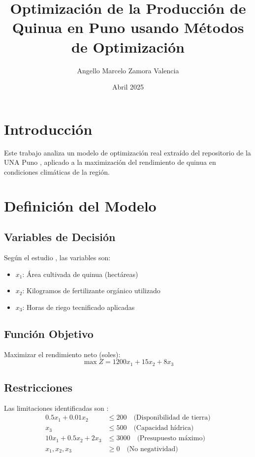 \documentclass{article}
\title{Optimización de la Producción de Quinua en Puno usando Métodos de Optimización}
\author{Angello Marcelo Zamora Valencia}
\date{Abril 2025}
\begin{document}
\maketitle

\section{Introducción}
Este trabajo analiza un modelo de optimización real extraído del repositorio de la UNA Puno \cite{condori2024}, aplicado a la maximización del rendimiento de quinua en condiciones climáticas de la región.

\section{Definición del Modelo}
\subsection{Variables de Decisión}
Según el estudio \cite{condori2024}, las variables son:
\begin{itemize}
    \item $x_1$: Área cultivada de quinua (hectáreas)
    \item $x_2$: Kilogramos de fertilizante orgánico utilizado
    \item $x_3$: Horas de riego tecnificado aplicadas
\end{itemize}

\subsection{Función Objetivo}
Maximizar el rendimiento neto (soles):
\begin{equation}
    \max Z = 1200x_1 + 15x_2 + 8x_3
\end{equation}

\subsection{Restricciones}
Las limitaciones identificadas son \cite[p.~12]{condori2024}:
\begin{align}
    0.5x_1 + 0.01x_2 &\leq 200 \quad \text{(Disponibilidad de tierra)} \\
    x_3 &\leq 500 \quad \text{(Capacidad hídrica)} \\
    10x_1 + 0.5x_2 + 2x_3 &\leq 3000 \quad \text{(Presupuesto máximo)} \\
    x_1, x_2, x_3 &\geq 0 \quad \text{(No negatividad)}
\end{align}
\end{document}
